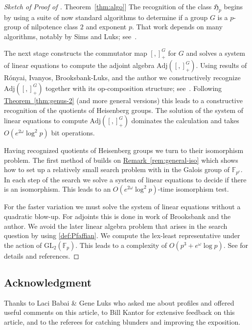 \documentclass[11pt]{article}
\numberwithin{equation}{section}
\theoremstyle{definition}
\theoremstyle{plain}
\newcommand{\expref}[2]{\hyperref[#2]{#1~\ref{#2}}}
\numberwithin{equation}{section}
\theoremstyle{plain}       %
\theoremstyle{remark}
\theoremstyle{definition}
\numberwithin{figure}{section}
\numberwithin{table}{section}
\newcommand{\bbF}{\mathbb{F}}  %
\begin{document}
\begin{proof}[Sketch of Proof of \expref{Theorem}{thm:algo}]
The recognition of the class $\mathfrak{H}_p$ begins by using a suite of now
standard algorithms to determine if a group $G$ is a $p$-group of nilpotence
class $2$ and exponent $p$.  That work depends on many algorithms, notably
by Sims and Luks; see~\cite{Seress}.  
	
The next stage constructs the commutator map $[,]_+^G$ for $G$ and solves a
system of linear equations to compute the adjoint algebra
$\mathrm{Adj}([,]_+^G)$.  Using results of
%
R\'onyai,  %
Ivanyos, Brooksbank-Luks,
and the author we constructively recognize $\mathrm{Adj}([,]_+^G)$ together
with its op-composition structure; 
%
see~\cite{LW, BW:autotopism}.    %
Following
\expref{Theorem}{thm:genus-2} (and more general versions) this leads
to a constructive recognition of the quotients of Heisenberg groups.
The solution of the system of linear equations to compute
$\mathrm{Adj}([,]_+^G)$ dominates the calculation and takes
$O(e^{2\omega}\log^2 p)$ bit operations.
	
Having recognized quotients of Heisenberg groups we turn to their
isomorphism problem.  The first method of \cite{LW} builds on
\expref{Remark}{rem:general-iso} which shows how to set up a relatively small
search problem with in the Galois group of $\bbF_{p^e}$. In each step of the
search we solve a system of linear equations to decide if there is an
isomorphism.  This leads to an $O(e^{2\omega}\log^2 p)$-time isomorphism
test.

For the faster variation we must solve the system of linear equations
without a quadratic blow-up.  For adjoints this is done in work of
Brooksbank and the author.  We avoid the later linear algebra problem that
arises in the search question by using \eqref{def:Pfaffian}.  We compute the
lex-least representative under the action of $\mathrm{GL}_2(\bbF_p)$.  This
leads to a complexity of $O(p^3+e^{\omega}\log p)$.  See \cite{BMW} for
details and references.
\end{proof}

%
%
%
%
%
%
%
%
%
%
%
%
%
%
%
%
%
%
%
%
%
%
%
%
%
%
%
%
%
%
%
%
%
%
%
%
%
%
%
%
%
%
%
%
%
%
%
%
%
%
%
%
%
%
%
%
%
%
%
%
%
%
%
%
%
%
%
%
%
%
%
%
%
%
%
%
%
%
%
%
%

%
%
%
%
%
%
%
%

%



\subsection*{Acknowledgment}
Thanks to Laci Babai \& Gene Luks who asked me about profiles and offered useful
comments on this article, to Bill Kantor for extensive feedback on this article,
and to the referees for catching blunders and improving the exposition.
\end{document}
